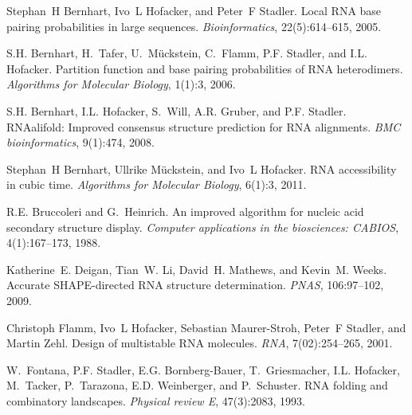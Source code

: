 
\begin{DoxyDescription}
\item[\label{_CITEREF_bernhart:2005}%
\mbox{[}1\mbox{]}]Stephan~H Bernhart, Ivo~L Hofacker, and Peter~F Stadler. Local R\+NA base pairing probabilities in large sequences. {\itshape Bioinformatics}, 22(5)\+:614--615, 2005.


\item[\label{_CITEREF_bernhart:2006}%
\mbox{[}2\mbox{]}]S.\+H. Bernhart, H.~Tafer, U.~M\"{u}ckstein, C.~Flamm, P.\+F. Stadler, and I.\+L. Hofacker. Partition function and base pairing probabilities of R\+NA heterodimers. {\itshape Algorithms for Molecular Biology}, 1(1)\+:3, 2006.


\item[\label{_CITEREF_bernhart:2008}%
\mbox{[}3\mbox{]}]S.\+H. Bernhart, I.\+L. Hofacker, S.~Will, A.\+R. Gruber, and P.\+F. Stadler. R\+N\+Aalifold\+: Improved consensus structure prediction for R\+NA alignments. {\itshape B\+MC bioinformatics}, 9(1)\+:474, 2008.


\item[\label{_CITEREF_bernhart:2011}%
\mbox{[}4\mbox{]}]Stephan~H Bernhart, Ullrike M\"{u}ckstein, and Ivo~L Hofacker. R\+NA accessibility in cubic time. {\itshape Algorithms for Molecular Biology}, 6(1)\+:3, 2011.


\item[\label{_CITEREF_bruccoleri:1988}%
\mbox{[}5\mbox{]}]R.\+E. Bruccoleri and G.~Heinrich. An improved algorithm for nucleic acid secondary structure display. {\itshape Computer applications in the biosciences\+: C\+A\+B\+I\+OS}, 4(1)\+:167--173, 1988.


\item[\label{_CITEREF_deigan:2009}%
\mbox{[}6\mbox{]}]Katherine~E. Deigan, Tian~W. Li, David~H. Mathews, and Kevin~M. Weeks. Accurate S\+H\+A\+P\+E-\/directed R\+NA structure determination. {\itshape P\+N\+AS}, 106\+:97--102, 2009.


\item[\label{_CITEREF_flamm:2001}%
\mbox{[}7\mbox{]}]Christoph Flamm, Ivo~L Hofacker, Sebastian Maurer-\/\+Stroh, Peter~F Stadler, and Martin Zehl. Design of multistable R\+NA molecules. {\itshape R\+NA}, 7(02)\+:254--265, 2001.


\item[\label{_CITEREF_fontana:1993b}%
\mbox{[}8\mbox{]}]W.~Fontana, P.\+F. Stadler, E.\+G. Bornberg-\/\+Bauer, T.~Griesmacher, I.\+L. Hofacker, M.~Tacker, P.~Tarazona, E.\+D. Weinberger, and P.~Schuster. R\+NA folding and combinatory landscapes. {\itshape Physical review E}, 47(3)\+:2083, 1993.



\end{DoxyDescription}
